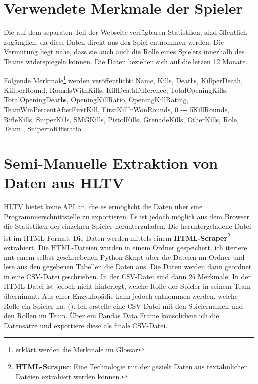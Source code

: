 \documentclass[envcountsame, envcountchap, deutsch]{i-studis}
\begin{document}
\section{Verwendete Merkmale der Spieler}
Die auf dem separaten Teil der Webseite verfügbaren Statistiken, sind öffentlich zugänglich, da diese Daten direkt aus den Spiel entnommen werden. 
Die Vermutung liegt nahe, dass sie auch auch die Rolle eines Spielers innerhalb des Teams widerspiegeln können. Die Daten beziehen sich auf die letzen 12 Monate.

Folgende Merkmale\footnote{erklärt werden die Merkmale im Glossar} werden veröffentlicht:
\newline
\Gls{Name}, \Gls{Kills}, \Gls{Deaths}, \Gls{KillperDeath}, \Gls{KillperRound}, \Gls{RoundsWithKills}, \Gls{KillDeathDifference}, \Gls{TotalOpeningKills}, 
\Gls{TotalOpeningDeaths}, \Gls{OpeningKillRatio}, \Gls{OpeningKillRating}, \Gls{TeamWinPercentAfterFirstKill}, \Gls{FirstKillInWonRounds}, 
\Gls{0 --- 5KillRounds}, \Gls{RifleKills}, \Gls{SniperKills}, \Gls{SMGKills}, \Gls{PistolKills}, \Gls{GrenadeKills}, \Gls{OtherKills}, \Gls{Role}, \Gls{Team}
, \Gls{SnipertoRifleratio}

\section{Semi-Manuelle Extraktion von Daten aus HLTV}
HLTV bietet keine \Gls{API} an, die es ermöglicht die Daten über eine Programmierschnittstelle zu exportieren. Es ist jedoch möglich aus dem Browser die 
Statistiken der einzelnen Spieler herunterzuladen. Die heruntergeladene Datei ist im HTML-Format. Die Daten werden mittels einem \textbf{HTML-Scraper}\footnote{\textbf{HTML-Scraper}: Eine Technologie mit der gezielt Daten aus textähnlichen Dateien extrahiert werden können.} extrahiert. 
Die HTML-Dateien wurden in einem Ordner gespeichert, ich iteriere mit einem selbst geschriebenen Python Skript über 
die Dateien im Ordner und lese aus den gegebenen Tabellen die Daten aus. Die Daten werden dann geordnet in eine \Gls{CSV-Datei} geschrieben. In der \Gls{CSV-Datei}
sind dann 26 Merkmale. In der HTML-Datei ist jedoch nicht hinterlegt, welche Rolle der Spieler in seinem Team übernimmt. Aus einer Enzyklopädie kann 
jedoch entnommen werden, welche Rolle ein Spieler hat (\cite{Landsmann_2021}).
Ich erstelle eine \Gls{CSV-Datei} mit den Spielernamen und den Rollen im Team. Über ein Pandas Data Frame konsolidiere ich die Datensätze und exportiere 
diese als finale \Gls{CSV-Datei}.
\end{document}
